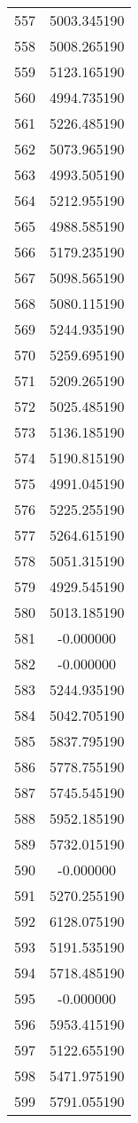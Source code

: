 \documentclass[12pt]{article}
\begin{document}
\begin{longtable}{@{}cc@{}}
557 & 5003.345190 \\
558 & 5008.265190 \\
559 & 5123.165190 \\
560 & 4994.735190 \\
561 & 5226.485190 \\
562 & 5073.965190 \\
563 & 4993.505190 \\
564 & 5212.955190 \\
565 & 4988.585190 \\
566 & 5179.235190 \\
567 & 5098.565190 \\
568 & 5080.115190 \\
569 & 5244.935190 \\
570 & 5259.695190 \\
571 & 5209.265190 \\
572 & 5025.485190 \\
573 & 5136.185190 \\
574 & 5190.815190 \\
575 & 4991.045190 \\
576 & 5225.255190 \\
577 & 5264.615190 \\
578 & 5051.315190 \\
579 & 4929.545190 \\
580 & 5013.185190 \\
581 & -0.000000 \\
582 & -0.000000 \\
583 & 5244.935190 \\
584 & 5042.705190 \\
585 & 5837.795190 \\
586 & 5778.755190 \\
587 & 5745.545190 \\
588 & 5952.185190 \\
589 & 5732.015190 \\
590 & -0.000000 \\
591 & 5270.255190 \\
592 & 6128.075190 \\
593 & 5191.535190 \\
594 & 5718.485190 \\
595 & -0.000000 \\
596 & 5953.415190 \\
597 & 5122.655190 \\
598 & 5471.975190 \\
599 & 5791.055190 \\

\end{longtable}
\end{document}
